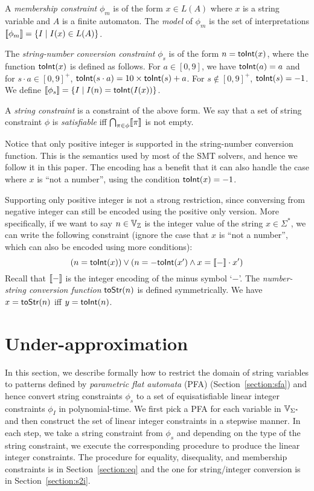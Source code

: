 \documentclass[sigplan,review,anonymous]{acmart}\settopmatter{printfolios=true,printccs=false,printacmref=false}
\begin{document}
A \emph{membership constraint} $\phi_m$ is of the form $x \in L(A)$ where $x$ is a string variable and $A$ is a finite automaton. The \emph{model} of $\phi_m$ is the set of interpretations $[\![\phi_m]\!]=\{I\mid 
I(x) \in L(A) \}$. 

The \emph{string-number conversion constraint} $\phi_s$ is of the form $n=\mbox{\textsf{toInt}($x$)}$, where the function $\mbox{\textsf{toInt}($x$)}$ is defined as follows. For $a\in [0,9]$, we have $\mbox{\textsf{toInt}($a$)}=a$ and for $s \cdot a \in [0,9]^+$, $\mbox{\textsf{toInt}($s\cdot a$)} = 10\times \mbox{\textsf{toInt}($s$)}+a$. For $s\notin [0,9]^+$, $\mbox{\textsf{toInt}($s$)}=-1$. We define  $[\![\phi_s]\!]= \{I \mid I(n)= \mbox{\textsf{toInt}($I(x)$)} \}$.

A \emph{string constraint} is a constraint of the above form. We say that a set of string constraint $\phi$ is \emph{satisfiable}  iff $\bigcap_{\pi \in \phi} [\![\pi]\!]$ is not empty.

Notice that only positive integer is supported in the string-number conversion function. This is the semantics used by most of the SMT solvers, and hence we follow it in this paper. The encoding has a benefit that it can also handle the case where $x$ is ``not a number'', using the condition $\mbox{\textsf{toInt}($x$)} = -1$.

Supporting only positive integer is not a strong restriction, since conversing from negative integer can still be encoded using the positive only version. More specifically, if we want to say $n \in \mbox{$\mathbb{V}_{\mathbb{Z}}$}$ is the integer value of the string $x \in \Sigma^*$, we can write the following constraint (ignore the case that $x$ is ``not a number'', which can also be encoded using more conditions):
$$(n= \mbox{\textsf{toInt}($x$)}) \vee (n=-\mbox{\textsf{toInt}($x'$)} \wedge x = [\![-]\!]\cdot x')$$
Recall that $[\![-]\!]$ is the integer encoding of the minus symbol `$-$'. The \emph{number-string conversion function} $\mbox{\textsf{toStr}($n$)}$ is defined symmetrically. We have $x = \mbox{\textsf{toStr}($n$)}$ iff $y= \mbox{\textsf{toInt}($n$)}$. 


\section{Under-approximation} \label{section:under_approximate}
In this section, we describe formally how to restrict the domain of string variables to patterns defined by \emph{parametric flat automata} (PFA) (Section~\ref{section:sfa}) and hence convert string constraints $\phi_s$ to a set of equisatisfiable linear integer constraints $\phi_I$ in polynomial-time. We first pick a PFA for each variable in $\mbox{$\mathbb{V}_{\Sigma^*}$}$ and then construct the set of linear integer constraints in a stepwise manner. In each step, we take a string constraint from $\phi_s$ and depending on the type of the string constraint, we execute the corresponding procedure to produce the linear integer constraints. The procedure for equality, disequality, and membership constraints is in Section~\ref{section:eq} and the one for string/integer conversion is in Section~\ref{section:s2i}.
\end{document}
